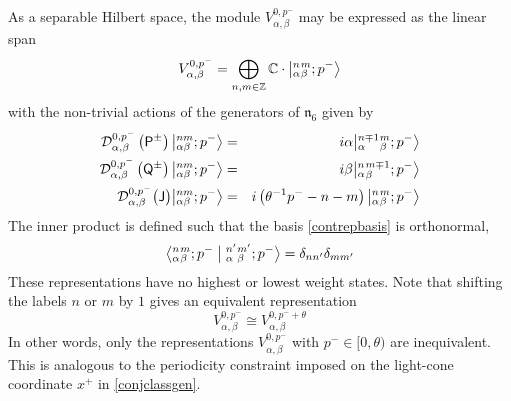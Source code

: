 As a separable Hilbert space, the module $V^{0,p^-}_{\alpha,\beta}$ may be
expressed as the linear span
\begin{equation}
  \label{contrepbasis}
  V^{0,p^-}_{\alpha,\beta}=\bigoplus_{n,m\in{\mathbb Z}}{\mathbb C}\cdot
  \left|^n_\alpha {}^m_\beta ; p^-\right\rangle
\end{equation}
with the non-trivial actions of the generators of $\mathfrak{n}_6$
given by
\begin{eqnarray}
  \label{contrepactions}
  \mathcal{D}^{0,p^-}_{\alpha,\beta}\left({\sf P}^\pm\right)
  \bigl| {}^{nm}_{\alpha\beta} ; p^-\bigr\rangle
  &=& i\alpha \bigl| {}^{n\mp1}_\alpha {}^m_\beta ; p^-\bigr\rangle \\\nonumber
  \mathcal{D}^{0,p^-}_{\alpha,\beta}\left({\sf Q}^\pm\right)
  \bigl| {}^{nm}_{\alpha\beta} ; p^-\bigr\rangle
  &=& i\beta \bigl| {}^n_\alpha {}^{m\mp1}_\beta ; p^-\bigr\rangle \\\nonumber
  \mathcal{D}^{0,p^-}_{\alpha,\beta}\bigl({\sf J} 
  \bigr)\bigl| {}^{nm}_{\alpha\beta} ; p^-\bigr\rangle
  &=& i\left(\theta^{-1} p^--n-m\right) \bigl| {}^n_\alpha {}^m_\beta
  ; p^-\bigr\rangle
\end{eqnarray}
The inner product is defined such that the basis \eqref{contrepbasis} is
orthonormal,
\begin{equation}
  \label{contreportho}
  \bigl\langle {}^n_\alpha {}^m_\beta ; p^-\bigm| 
  {}^{n'}_\alpha {}^{m'}_\beta ; p^-\bigr\rangle=
  \delta_{nn'} \delta_{mm'}
\end{equation}
These representations have no highest or lowest weight states. Note that
shifting the labels $n$ or $m$ by $1$ gives an equivalent representation
\begin{equation}
  \label{contrepinequiv}
  V^{0,p^-}_{\alpha,\beta}\cong V^{0,p^-+\theta}_{\alpha,\beta}
\end{equation}
In other words, only the representations $V^{0,p^-}_{\alpha,\beta}$ with
$p^-\in[0,\theta)$ are inequivalent. This is analogous to the periodicity
constraint imposed on the light-cone coordinate $x^+$ in \eqref{conjclassgen}.

